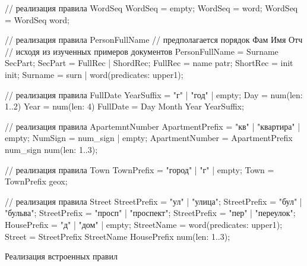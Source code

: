 \begin{ListingEnv}
\begin{Verb}
// реализация правила WordSeq
WordSeq = empty;
WordSeq = word;
WordSeq = WordSeq word;

// реализация правила PersonFullName
// предполагается порядок Фам Имя Отч
// исходя из изученных примеров документов
PersonFullName = Surname SecPart;
SecPart = FullRec | ShordRec;
FullRec = name patr;
ShortRec = init init;
Surname = surn | word(predicates: upper1);

// реализация правила FullDate
YearSuffix = "г" | "год" | empty;
Day = num(len: 1..2)
Year = num(len: 4)
FullDate = Day Month Year YearSuffix;

// реализация правила ApartemntNumber
ApartmentPrefix = "кв" | "квартира" | empty;
NumSign = num_sign | empty;
ApartmentNumber = ApartmentPrefix num_sign num(len: 1..3);

// реализация правила Town
TownPrefix = "город" | "г" | empty;
Town = TownPrefix geox;

// реализация правила Street
StreetPrefix = "ул" | "улица";
StreetPrefix = "бул" | "бульва";
StreetPrefix = "просп" | "проспект";
StreetPrefix = "пер" | "переулок";
HousePrefix = "д" | "дом" | empty;
StreetName = word(predicates: upper1);
Street = StreetPrefix StreetName HousePrefix num(len: 1..3); 
\end{Verb}
\caption{Реализация встроенных правил}
\label{list:StandardRules}
\end{ListingEnv}

